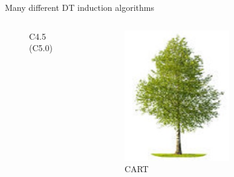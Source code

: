 \documentclass[english]{beamer}
\begin{document}
\begin{frame}{Many different DT induction algorithms}
\begin{columns}
\begin{column}{0.25\textwidth}
\begin{figure}
				\caption{C4.5 (C5.0)}
			\end{figure}
		\end{column}
		\begin{column}{0.25\textwidth}
			\centering
			\begin{figure}
				\includegraphics[width=\textwidth]{figures/berk.jpg}
				\caption{CART}
			\end{figure}
		\end{column}
		\begin{column}{0.25\textwidth}
			\centering
			\begin{figure}

\end{figure}
\end{column}
\end{columns}
\end{frame}
\end{document}
